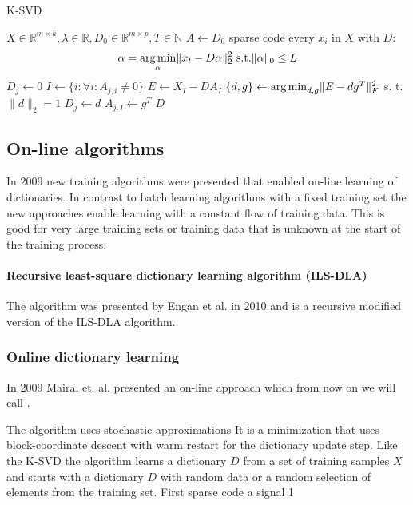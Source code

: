 \begin{algorithm}[H]
\caption{K-SVD}
\label{alg:k-svd}
\begin{algorithmic}[1]
\REQUIRE $X \in \mathbb{R}^{m \times k}, \lambda \in
\mathbb{R}, D_0 \in \mathbb{R}^{m \times p}, T \in \mathbb{N}$
\STATE $A \gets D_0$
\STATE sparse code every $x_i$ in $X$ with $D$:
\begin{equation}
\alpha = \operatorname*{arg\,min}_{\alpha}\lVert
x_t - D\alpha\rVert_2^2 \text{ s.t.} \lVert\alpha\rVert_0 \leq L
\end{equation}
\label{alg:k-svd_start}
\STATE $D_j \gets 0$
\STATE $I \gets \{ i : \forall i : A_{j,i} \neq 0 \}$
\STATE $E \gets X_I - DA_I$
\STATE $\{ d,g\} \gets \operatorname*{arg\,min}_{d,g} \lVert E- dg^T \rVert_F^{2}$ s. t. $\lVert
d
\rVert_{2} = 1$
\STATE $D_j \gets d$
\STATE $A_{j,I} \gets g^T$
\ENDFOR\label{alg:k-svd_end}
\ENDFOR
\RETURN $D$
\end{algorithmic}
\end{algorithm}

\subsection{On-line algorithms}
In 2009 new training algorithms were presented that enabled on-line learning of
dictionaries. In contrast to batch learning algorithms with a fixed training set
the new approaches enable learning with a constant flow of training data. This
is good for very large training sets or training data that is unknown at the
start of the training process.

\paragraph{Recursive least-square dictionary learning algorithm (ILS-DLA)}
The algorithm was presented by Engan et al. in 2010\cite{Engan2010} and is a
recursive modified version of the ILS-DLA algorithm.


\subsubsection{Online dictionary learning}
\label{sec:mairal}
In 2009 Mairal et. al.\cite{Mairal2009} presented an on-line approach which from
now on we will call \trainDL.

The algorithm uses stochastic approximations 
It is a minimization that uses block-coordinate descent with warm restart for
the dictionary update step.
Like the K-SVD the algorithm learns a dictionary $D$ from a set of training
samples $X$ and starts with a dictionary $D$ with random data or a random
selection of elements from the training set. 
First sparse code a signal  1


